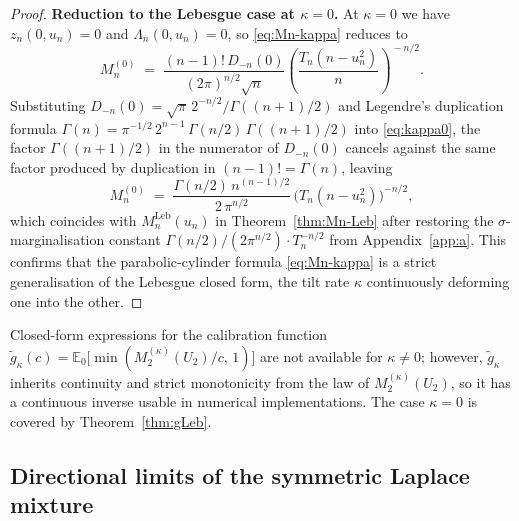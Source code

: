 \documentclass[12pt, a4paper]{report}
\newcommand{\E}{\mathbb{E}}
\newcommand{\Leb}{\mathrm{Leb}}
\newcommand{\1}{\mathbf{1}}
\begin{document}
\begin{proof}
\textbf{Reduction to the Lebesgue case at $\kappa=0$.}
\quad
At $\kappa=0$ we have $z_n(0,u_n)=0$ and $\Lambda_n(0,u_n)=0$, so
\eqref{eq:Mn-kappa} reduces to
\begin{equation}\label{eq:kappa0}
  M_n^{(0)}
  \;=\;\frac{(n-1)!\,D_{-n}(0)}{(2\pi)^{n/2}\sqrt n}
  \!\left(\frac{T_n(n-u_n^2)}{n}\right)^{\!-n/2}.
\end{equation}
Substituting $D_{-n}(0)=\sqrt\pi\,2^{-n/2}/\Gamma((n+1)/2)$ and
Legendre's duplication formula
$\Gamma(n)=\pi^{-1/2}\,2^{n-1}\,\Gamma(n/2)\,\Gamma((n+1)/2)$ into
\eqref{eq:kappa0}, the factor $\Gamma((n+1)/2)$ in the numerator of
$D_{-n}(0)$ cancels against the same factor produced by duplication in
$(n-1)!=\Gamma(n)$, leaving
\[
  M_n^{(0)}
  \;=\;\frac{\Gamma(n/2)\,n^{(n-1)/2}}{2\,\pi^{n/2}}
  \,\bigl(T_n(n-u_n^2)\bigr)^{-n/2},
\]
which coincides with $M_n^{\Leb}(u_n)$ in Theorem~\ref{thm:Mn-Leb} after
restoring the $\sigma$-marginalisation constant
$\Gamma(n/2)/(2\pi^{n/2})\cdot T_n^{-n/2}$ from Appendix~\ref{app:a}. This
confirms that the parabolic-cylinder formula \eqref{eq:Mn-kappa} is a
strict generalisation of the Lebesgue closed form, the tilt rate
$\kappa$ continuously deforming one into the other.
\end{proof}

\begin{remark}
Closed-form expressions for the calibration function
\(\widetilde g_\kappa(c)=\E_0\bigl[\min(M_2^{(\kappa)}(U_2)/c,\,1)\bigr]\)
are not available for \(\kappa\neq 0\); however,
\(\widetilde g_\kappa\) inherits continuity and strict monotonicity
from the law of \(M_2^{(\kappa)}(U_2)\), so it has a continuous
inverse usable in numerical implementations. The case \(\kappa=0\) is
covered by Theorem~\ref{thm:gLeb}.
\end{remark}

\subsection{Directional limits of the symmetric Laplace mixture}
\label{sec:laplace-limits}
\end{document}

